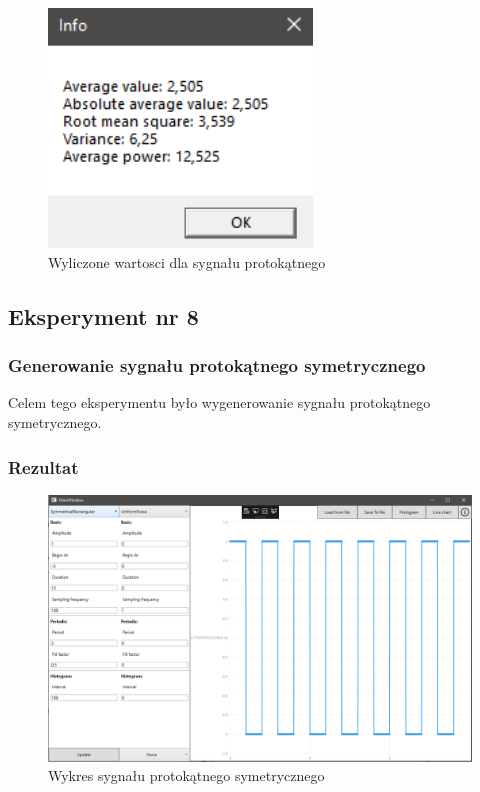 \documentclass[12pt]{article}
\begin{document}
\begin{figure}[H]
 \centering
 \includegraphics[width=7cm]{images/rect1info.PNG}
 \vspace{-0.3cm}
 \caption{Wyliczone wartosci dla sygnału protokątnego}
 \label{gui}
\end{figure}




\subsection{Eksperyment nr 8 }
\subsubsection{Generowanie sygnału protokątnego symetrycznego}
Celem tego eksperymentu było wygenerowanie sygnału protokątnego symetrycznego.


\subsubsection{Rezultat}

\begin{figure}[H]
 \centering
 \includegraphics[width=14cm]{images/symrect1.PNG}
 \vspace{-0.3cm}
 \caption{Wykres sygnału protokątnego symetrycznego}
 \label{gui}
\end{figure}
\end{document}
